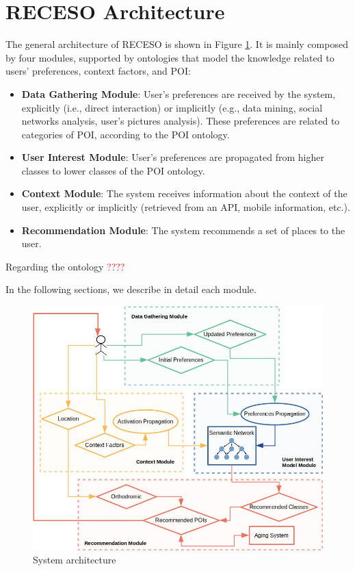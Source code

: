 \section{RECESO Architecture}
\label{sec:proposal}

The general architecture of RECESO is shown in Figure \ref{fig:arquitecture}. It is mainly composed by four modules, supported by ontologies that model the knowledge related to users' preferences, context factors, and POI:  
\begin{itemize}
    \item \textbf{Data Gathering Module}: User's preferences are received by the system, explicitly (i.e., direct interaction) or implicitly (e.g., data mining, social networks analysis, user's pictures analysis). These preferences are related to categories of POI, according to the POI ontology. 
    \item \textbf{User Interest Module}: User's preferences are propagated from higher classes to lower classes of the POI ontology.
    \item \textbf{Context Module}: The system receives information about the context of the user, explicitly or implicitly (retrieved from an API, mobile information, etc.).
    \item \textbf{Recommendation Module}: The system recommends a set of places to the user.
\end{itemize}

Regarding the ontology  \textcolor{red}{????}
      
In the following sections, we describe in detail each module.


\begin{figure}[h]
\centering
\includegraphics[scale=0.4]{draws/arquitecture.jpg}
\caption{System architecture}
\label{fig:arquitecture}
\end{figure}

